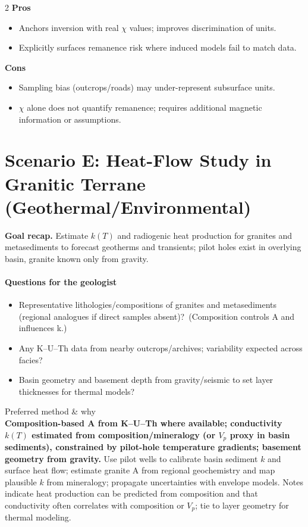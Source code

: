 \documentclass[11pt,a4paper]{article}
\begin{document}
\begin{multicols}{2}
\textbf{Pros}
\begin{itemize}[leftmargin=*]
  \item Anchors inversion with real $\chi$ values; improves discrimination of units.\label{notesref}
  \item Explicitly surfaces remanence risk where induced models fail to match data.
\end{itemize}
\columnbreak
\textbf{Cons}
\begin{itemize}[leftmargin=*]
  \item Sampling bias (outcrops/roads) may under-represent subsurface units.\label{notesref}
  \item $\chi$ alone does not quantify remanence; requires additional magnetic information or assumptions.
\end{itemize}
\end{multicols}

\section*{Scenario E: Heat-Flow Study in Granitic Terrane (Geothermal/Environmental)}
\textbf{Goal recap.} Estimate $k(T)$ and radiogenic heat production for granites and metasediments to forecast geotherms and transients; pilot holes exist in overlying basin, granite known only from gravity.

\paragraph{Questions for the geologist}
\begin{itemize}[leftmargin=*]
  \item Representative lithologies/compositions of granites and metasediments (regional analogues if direct samples absent)?~(Composition controls A and influences k.)\label{notesref}
  \item Any K--U--Th data from nearby outcrops/archives; variability expected across facies?\label{notesref}
  \item Basin geometry and basement depth from gravity/seismic to set layer thicknesses for thermal models?
\end{itemize}

Preferred method \& why\\
\textbf{Composition-based A from K--U--Th where available; conductivity $k(T)$ estimated from composition/mineralogy (or $V_p$ proxy in basin sediments), constrained by pilot-hole temperature gradients; basement geometry from gravity.} Use pilot wells to calibrate basin sediment $k$ and surface heat flow; estimate granite A from regional geochemistry and map plausible $k$ from mineralogy; propagate uncertainties with envelope models. Notes indicate heat production can be predicted from composition and that conductivity often correlates with composition or $V_p$; tie to layer geometry for thermal modeling.\label{notesref}
\end{document}
